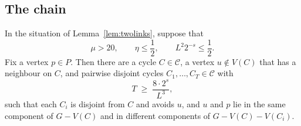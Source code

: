 \subsection{The chain}

\begin{lemma}[Chain]\label{lem:chain}
In the situation of Lemma~\ref{lem:twolinks}, suppose that
\[
  \mu>20,\qquad\eta\le\frac12,\qquad L^{2}2^{-s}\le\frac12 .
\]
Fix a vertex $p\in P$. Then there are a cycle $C\in\mathcal C$, a vertex $u\notin V(C)$ that has a
neighbour on $C$, and pairwise disjoint cycles $C_1,\dots,C_T\in\mathcal C$ with
\[
  T\;\ge\;\frac{8\cdot2^{s}}{L^{3}},
\]
such that each $C_i$ is disjoint from $C$ and avoids $u$, and $u$ and $p$ lie in the same component
of $G-V(C)$ and in different components of $G-V(C)-V(C_i)$.
\end{lemma}

